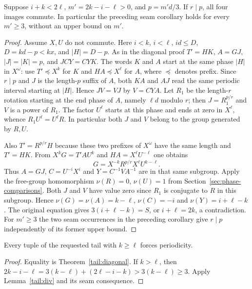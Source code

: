\begin{lemma}\label{tail:div}
Suppose $i+k<2\ell$, $m'=2k-i-\ell>0$, and $p=m'd/3$.
If $r\mid p$, all four images commute. In particular the preceding seam
corollary holds for every $m'\ge3$, without an upper bound on $m'$.
\end{lemma}
\begin{proof}
Assume $X,U$ do not commute. Here $i<k$, $i<\ell$, $id\le D$,
$D=kd-p<kx$, and $|H|=D-p$. As in the diagonal proof $T'=HK$,
$A=GJ$, $|J|=|K|=p$, and $JCY=CYK$.
The words $K$ and $A$ start at the same phase $|H|$ in $X^\omega$:
use $T'\preceq X^k$ for $K$ and $HA\preceq X^\ell$ for $A$,
where $\preceq$ denotes prefix. Since $r\mid p$ and $J$ is the
length-$p$ suffix of $A$, both $KA$ and $AJ$ read the same periodic
interval starting at $|H|$. Hence $JV=VJ$ by $V=CYA$.
Let $R_1$ be the length-$r$ rotation starting at the end phase of $A$,
namely $\ell d$ modulo $r$; then $J=R_1^{p/r}$ and $V$ is a power
of $R_1$. The factor $U^\ell$ starts at this phase and ends at zero
in $X^\ell$, whence $R_1U^\ell=U^\ell R$. In particular both $J$
and $V$ belong to the group generated by $R,U$.

Also $T'=R^{p/r}H$ because these two prefixes of $X^\omega$ have the
same length and $T'=HK$. From $X^kG=T'AU^k$ and $HA=X^\ell U^{-\ell}$
one obtains
\[
 G=X^{-k}R^{p/r} X^\ell U^{k-\ell}.
\]
Thus $A=GJ$, $C=U^{-i}X^i$ and $Y=C^{-1}VA^{-1}$ are in that
same subgroup. Apply the free-group homomorphism $\nu(R)=0$, $\nu(U)=1$
from Section~\ref{sec:phase-comparisons}. Both $J$ and $V$ have value
zero since $R_1$ is conjugate to $R$ in this subgroup.
Hence $\nu(G)=\nu(A)=k-\ell$, $\nu(C)=-i$ and
$\nu(Y)=i+\ell-k$. The original equation gives
$3(i+\ell-k)=S$, or $i+\ell=2k$, a contradiction.
For $m'\ge3$ the two seam occurrences in the preceding corollary
give $r\mid p$ independently of its former upper bound.
\end{proof}

\begin{corollary}
Every tuple of the requested tail with $k\ge\ell$ forces periodicity.
\end{corollary}
\begin{proof}
Equality is Theorem~\ref{tail:diagonal}. If $k>\ell$, then
$2k-i-\ell=3(k-\ell)+(2\ell-i-k)>3(k-\ell)\ge3$.
Apply Lemma~\ref{tail:div} and its seam consequence.
\end{proof}

